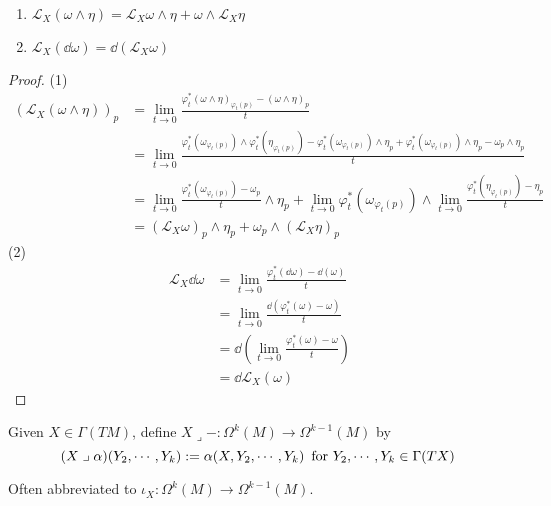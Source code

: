 \begin{lemma}
    \,
    \begin{enumerate}[label=(\arabic*)]
        \item  $ \mathcal{L}_X(\omega\wedge \eta)=\mathcal{L}_X\omega\wedge\eta+\omega\wedge\mathcal{L}_X\eta $ 
        \item  $ \mathcal{L}_X(\dd \omega)=\dd(\mathcal{L}_X\omega) $ 
    \end{enumerate}
\end{lemma}
\begin{proof}
    (1)\begin{equation}
            \begin{aligned}
                \left(\mathcal{L}_X(\omega\wedge\eta)\right)_p&=\lim_{t\to 0}\frac{\varphi_t^*(\omega\wedge\eta)_{\varphi_t(p)}-(\omega\wedge\eta)_p}{t}\\
                &=\lim_{t\to 0}\frac{\varphi_t^*(\omega_{\varphi_t(p)})\wedge\varphi_t^*(\eta_{\varphi_t(p)})-\varphi_t^*(\omega_{\varphi_t(p)})\wedge\eta_p+\varphi_t^*(\omega_{\varphi_t(p)})\wedge\eta_p-\omega_p\wedge\eta_p}{t}\\
                &=\lim_{t\to 0}\frac{\varphi_t^*(\omega_{\varphi_t(p)})-\omega_p}{t}\wedge\eta_p+\lim_{t\to 0}\varphi_t^*(\omega_{\varphi_t(p)})\wedge\lim_{t\to 0}\frac{\varphi_t^*(\eta_{\varphi_t(p)})-\eta_p}{t}\\
                &=\left(\mathcal{L}_X\omega\right)_p\wedge\eta_p+\omega_p\wedge\left(\mathcal{L}_X\eta\right)_p
            \end{aligned}
        \end{equation}
    (2)
    \begin{align*}
        \mathcal{L}_X\dd\omega&=\lim_{t\to 0}\frac{\varphi_t^*(\dd\omega)-\dd(\omega)}{t}\\
        &=\lim_{t\to 0}\frac{\dd (\varphi_t^*(\omega)-\omega)}{t}\\
        &=\dd\left(\lim_{t\to 0}\frac{\varphi_t^*(\omega)-\omega}{t}\right)\\
        &=\dd\mathcal{L}_X(\omega)
    \end{align*}
\end{proof}
Given  $ X\in \Gamma(TM) $, define   $ X\mathrel{\lrcorner} -:\Omega^k(M)\rightarrow \Omega^{k-1}(M)  $ by 
    \[(X\mathrel{\lrcorner}\alpha)(Y_2,\cdots,Y_k):=\alpha(X,Y_2,\cdots,Y_k)\,\text{ for  $ Y_2,\cdots,Y_k\in \Gamma(TX) $ }\] 
    
Often abbreviated to  $ \iota_X:\Omega^k(M)\rightarrow \Omega^{k-1}(M) $. 

